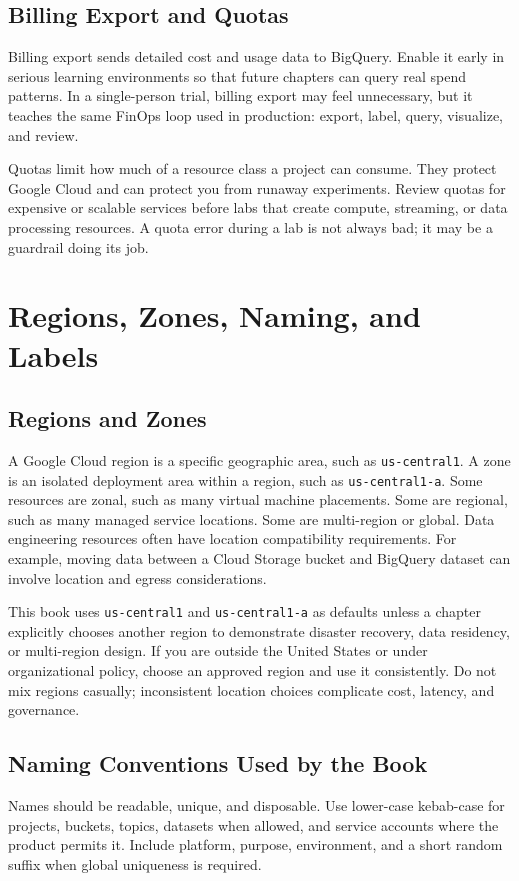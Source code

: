 \subsection{Billing Export and Quotas}
Billing export sends detailed cost and usage data to BigQuery. Enable it early in serious learning environments so that future chapters can query real spend patterns. In a single-person trial, billing export may feel unnecessary, but it teaches the same FinOps loop used in production: export, label, query, visualize, and review.

Quotas limit how much of a resource class a project can consume. They protect Google Cloud and can protect you from runaway experiments. Review quotas for expensive or scalable services before labs that create compute, streaming, or data processing resources. A quota error during a lab is not always bad; it may be a guardrail doing its job.

\section{Regions, Zones, Naming, and Labels}

\subsection{Regions and Zones}
A Google Cloud region is a specific geographic area, such as \texttt{us-central1}. A zone is an isolated deployment area within a region, such as \texttt{us-central1-a}. Some resources are zonal, such as many virtual machine placements. Some are regional, such as many managed service locations. Some are multi-region or global. Data engineering resources often have location compatibility requirements. For example, moving data between a Cloud Storage bucket and BigQuery dataset can involve location and egress considerations.

This book uses \texttt{us-central1} and \texttt{us-central1-a} as defaults unless a chapter explicitly chooses another region to demonstrate disaster recovery, data residency, or multi-region design. If you are outside the United States or under organizational policy, choose an approved region and use it consistently. Do not mix regions casually; inconsistent location choices complicate cost, latency, and governance.

\subsection{Naming Conventions Used by the Book}
Names should be readable, unique, and disposable. Use lower-case kebab-case for projects, buckets, topics, datasets when allowed, and service accounts where the product permits it. Include platform, purpose, environment, and a short random suffix when global uniqueness is required.

